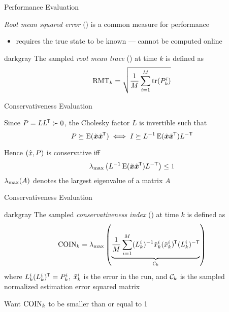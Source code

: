 \documentclass[aspectratio=1610]{beamer}
\begin{document}
\begin{frame}{Performance Evaluation}

\emph{Root mean squared error} (\abbrRMSE) is a common measure for performance
\begin{itemize}
    \item requires the true state to be known --- \alert{cannot be computed online}
\end{itemize}

\vspace{1em}

\begin{rfshadedcolorbox}[title={Root Mean Trace}]{darkgray}
    The sampled \emph{root mean trace} (\abbrRMT) at time $k$ is defined as
    \begin{equation*}
        \text{RMT}_k = \sqrt{\frac{1}{M}\sum_{i=1}^M \operatorname*{\rm tr}(P_k^i) }
    \end{equation*}
\end{rfshadedcolorbox}



\end{frame}


\begin{frame}{Conservativeness Evaluation}

Since $P=LL^{\mkern-1.5mu\mathsf{T}}\succ0$, the Cholesky factor $L$ is invertible such that
\begin{equation*}
    P \succeq \operatorname*{\rm E}(\tilde{\bm{x}}\tilde{\bm{x}}^{\mkern-1.5mu\mathsf{T}}) \iff I \succeq L^{-1} \operatorname*{\rm E}(\tilde{\bm{x}}\tilde{\bm{x}}^{\mkern-1.5mu\mathsf{T}}) L^{-\mathsf{T}}
\end{equation*}

\vspace{1em}

Hence $(\hat{x},P)$ is conservative iff
\[
    \lambda_{\max}\left(L^{-1}\operatorname*{\rm E}(\tilde{\bm{x}}\tilde{\bm{x}}^{\mkern-1.5mu\mathsf{T}}) L^{-\mathsf{T}}\right) \leq 1
\]
$\lambda_{\max}(A)$ denotes the largest eigenvalue of a matrix $A$

\end{frame}

\begin{frame}{Conservativeness Evaluation}

\begin{rfshadedcolorbox}[title={Conservativeness Index}]{darkgray}
    The sampled \emph{conservativeness index} (\abbrCOIN) at time $k$ is defined as
    \begin{equation*}
        \text{COIN}_k = \lambda_{\max}\left( \underbrace{\frac{1}{M} \sum_{i=1}^M (L_k^i)^{-1}\tilde{x}_k^i(\tilde{x}_k^i)^{\mkern-1.5mu\mathsf{T}}(L_k^i)^{-\mathsf{T}} }_{\mathcal{C}_k} \right)
    \end{equation*}
    where $L_k^i(L_k^i)^{\mkern-1.5mu\mathsf{T}}=P_k^i$, $\tilde{x}_k^i$ is the error in the \ith \abbrMC run, and $\mathcal{C}_k$ is the sampled normalized estimation error squared matrix
\end{rfshadedcolorbox}

\vspace{1em}

\alert{Want $\text{COIN}_k$ to be smaller than or equal to 1}

\end{frame}
\end{document}
